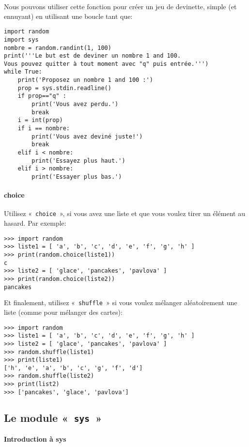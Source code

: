 Nous pouvons utiliser cette fonction pour créer un jeu de devinette, simple (et ennuyant) en utilisant une boucle tant que:

\begin{Verbatim}[frame=single,rulecolor=\color{gray}]
import random
import sys
nombre = random.randint(1, 100)
print('''Le but est de deviner un nombre 1 and 100.
Vous pouvez quitter à tout moment avec "q" puis entrée.''')
while True:
    print('Proposez un nombre 1 and 100 :')
    prop = sys.stdin.readline()
    if prop=="q" :
        print('Vous avez perdu.')
        break
    i = int(prop)
    if i == nombre:
        print('Vous avez deviné juste!')
        break
    elif i < nombre:
        print('Essayez plus haut.')
    elif i > nombre:
        print('Essayer plus bas.')
\end{Verbatim}

\paragraph{choice}

Utilisez «~\verb+choice+~»,  si vous avez une liste et que vous voulez tirer un élément au hasard. Par exemple:

\begin{Verbatim}[frame=single,rulecolor=\color{gray}]
>>> import random
>>> liste1 = [ 'a', 'b', 'c', 'd', 'e', 'f', 'g', 'h' ]
>>> print(random.choice(liste1))
c
>>> liste2 = [ 'glace', 'pancakes', 'pavlova' ]
>>> print(random.choice(liste2))
pancakes
\end{Verbatim}

Et finalement, utilisez «~\verb+shuffle+~» si vous voulez mélanger aléatoirement une liste (comme pour mélanger des cartes):

\begin{Verbatim}[frame=single,rulecolor=\color{gray}]
>>> import random
>>> liste1 = [ 'a', 'b', 'c', 'd', 'e', 'f', 'g', 'h' ]
>>> liste2 = [ 'glace', 'pancakes', 'pavlova' ]
>>> random.shuffle(liste1)
>>> print(liste1)
['h', 'e', 'a', 'b', 'c', 'g', 'f', 'd']
>>> random.shuffle(liste2)
>>> print(list2)
>>> ['pancakes', 'glace', 'pavlova']
\end{Verbatim}

\subsection*{Le module «~\texttt{sys}~»}
\paragraph{Introduction à sys}

